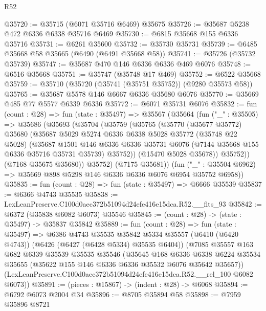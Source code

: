 \begin{lexlean}{R52}
\begin{coremodule}
@35720 := @35715 (@6071 @35716 @6469) @35675
@35726 := @35687 @5238 @472 @6336 @6338 @35716 @6469
@35730 := @6815 @35668 @155 @6336 @35716
@35731 := @6261 @35600
@35732 := @35730 @35731
@35739 := @6485 @35668 @58 @35665 (@6490 (@6491 @35668 @58))
@35741 := @35726 (@35732 @35739)
@35747 := @35687 @470 @146 @6336 @6336 @469 @6076
@35748 := @6516 @35668
@35751 := @35747 (@35748 @17 @469)
@35752 := @6522 @35668
@35759 := @35710 (@35720 (@35741 (@35751 @35752)) (@9280 @35573 @58))
@35765 := @35687 @5578 @146 @6667 @6336 @35680 @6076
@35770 := @35669 @485 @77 @5577 @6339 @6336
@35772 := @6071 @35731 @6076
@35832 := fun (count : @28) =>
  fun (state : @35497) =>
  @35567
    (@35664
      (fun ("_" : @35505) =>
      @35686
        (@35693
          (@35704
            (@35759
              (@35765
                (@35770
                  (@35677 @35772)
                  @35680
                  (@35687
                    @5029
                    @5274
                    @6336
                    @6338
                    @5028
                    @35772
                    (@35748 @22 @5028)
                    (@35687
                      @1501
                      @146
                      @6336
                      @6336
                      @35731
                      @6076
                      (@7144 @35668 @155 @6336 @35716 @35731 @35739)
                      @35752))
                  (@15470 @5028 @35678))
                @35752))
            (@7168 @35675 @35680))
          @35752)
        (@7175 @35681))
      (fun ("_" : @35504 @6962) => @35669 @898 @5298 @146 @6336 @6336 @6076 @6954 @35752 @6958))
@35835 := fun (count : @28) => fun (state : @35497) => @6666 @35539
@35837 := @6366 @4743 @35535
@35838 := LexLeanPreserve.C100d0aec372b51094d24efe416e15dca.R52.__fits_93
@35842 := @6372 (@35838 @6082 @6073) @35546
@35845 := (count : @28) -> (state : @35497) -> @35837 @35842
@35889 := fun (count : @28) =>
  fun (state : @35497) =>
  @6386
    @4743
    @35535
    @35842
    @5334
    @35557
    (@6410 (@6420 @4743))
    (@6426 (@6427 (@6428 @5334) @35535 @6404))
    (@7085
      @35557
      @163
      @682
      @6339
      @35539
      @35535
      @35546
      (@35645
        @168
        @6336
        @6338
        @6224
        @35534
        @35655
        (@35622 @155 @146 @6336 @6336 @35532 @6076 @35642 @35657))
      (LexLeanPreserve.C100d0aec372b51094d24efe416e15dca.R52.__rel_100 @6082 @6073))
@35891 := (pieces : @15867) -> (indent : @28) -> @6068
@35894 := @6792 @6073 @2004 @34
@35896 := @8705 @35894 @58
@35898 := @7959 @35896 @8721

\end{coremodule}
\end{lexlean}
